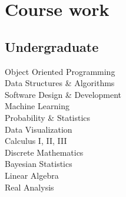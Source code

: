 \message{ !name(cv_12 copy.tex)}\documentclass[letterpaper]{deedy-resume}
\begin{document}
\begin{minipage}[t]{0.31\textwidth}
\section{Course work}
\subsection{Undergraduate}
Object Oriented Programming \\
Data Structures \& Algorithms \\
Software Design \& Development \\
Machine Learning \\
Probability \& Statistics \\
Data Visualization \\
Calculus I, II, III \\
Discrete Mathematics \\
Bayesian Statistics \\
Linear Algebra \\
Real Analysis
\sectionspace 

\end{minipage} 
\hfill
%
%
\end{document}

